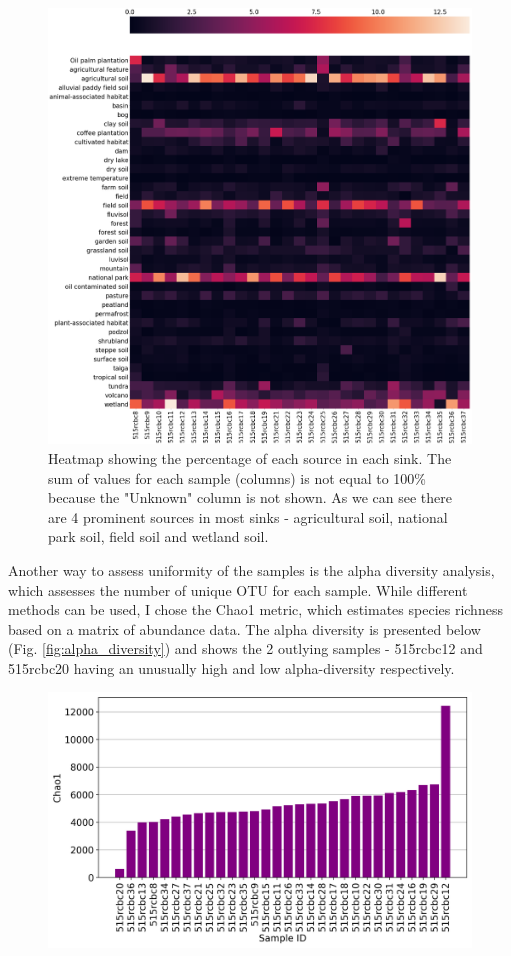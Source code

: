 \documentclass[12pt]{article}
\begin{document}
\begin{multicols}{2}
\begin{figure}[H]
	\includegraphics[width=\linewidth]{../sourcetracker/heatmap_perc.png}
	\caption{Heatmap showing the percentage of each source in each sink. The sum of values for each sample (columns) is not equal to 100\% because the "Unknown" column is not shown. As we can see there are 4 prominent sources in most sinks - agricultural soil, national park soil, field soil and wetland soil.}
	\label{fig:sourcetracker_heatmap}
\end{figure}
\par
Another way to assess uniformity of the samples is the alpha diversity analysis, which assesses the number of unique OTU for each sample. 
While different methods can be used, I chose the Chao1 metric, which estimates species richness based on a matrix of abundance data. 
The alpha diversity is presented below (Fig. \ref{fig:alpha_diversity}) and shows the 2 outlying samples - 515rcbc12 and 515rcbc20 having an unusually high and low alpha-diversity respectively.
\begin{figure}[H]
	\captionsetup{width=\linewidth}
	\includegraphics[width=\linewidth]{../analyses/figs/chao1_alpha.png}

\end{figure}
\end{multicols}
\end{document}
